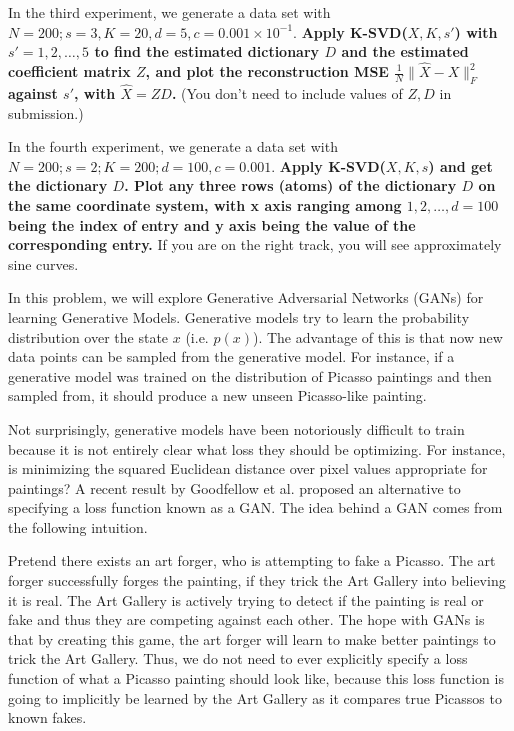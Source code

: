 \begin{Parts}
\Part In the third experiment, we generate a data set with $N = 200;
s=3, K=20, d=5, c=0.001\times 10^{-1}$. {\bf Apply K-SVD($X, K, s'$) with $s'=1,2,\dots,5$ to find the estimated dictionary $D$ and the estimated coefficient matrix $Z$, and plot the reconstruction MSE $\frac 1 N \|\hat X - X\|_F^2$ against $s'$, with $\hat X=ZD$.} (You don't need to include values of $Z,D$ in submission.)

 

\Part In the fourth experiment, we generate a data set with $N = 200;
s = 2; K = 200; d = 100, c=0.001$. {\bf Apply K-SVD($X, K, s$) and get the dictionary $D$. Plot any three rows (atoms) of the dictionary $D$ on the same coordinate system, with x axis ranging among $1,2,\dots,d=100$ being the index of entry and y axis being the value of the corresponding entry.} If you are on the right track, you will see approximately sine curves. 

 

\end{Parts} 
In this problem, we will explore Generative Adversarial Networks (GANs) for learning Generative Models. Generative models try to learn the probability distribution over the state $x$ (i.e. $p(x)$). The advantage of this is that now new data points can be sampled from the generative model. For instance, if a generative model was trained on the distribution of Picasso paintings and then sampled from, it should produce a new unseen Picasso-like painting. 

Not surprisingly, generative models have been notoriously difficult to train because it is not entirely clear what loss they should be optimizing. For instance, is minimizing the squared Euclidean distance over pixel values appropriate for paintings? A recent result by Goodfellow et al. proposed an alternative to specifying a loss function known as a GAN. The idea behind a GAN comes from the following intuition. 

Pretend there exists an art forger, who is attempting to fake a Picasso. The art forger successfully forges the painting, if they trick the Art Gallery into believing it is real. The Art Gallery is actively trying to detect if the painting is real or fake and thus they are competing against each other. The hope with GANs is that by creating this game, the art forger will learn to make better paintings to trick the Art Gallery. Thus, we do not need to ever explicitly specify a loss function of what a Picasso painting should look like, because this loss function is going to implicitly be learned by the Art Gallery as it compares true Picassos to known fakes. 


